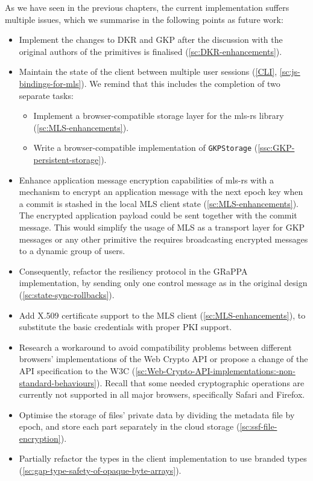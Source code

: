 As we have seen in the previous chapters,
the current implementation suffers multiple issues,
which we summarise in the following points as future work:
\begin{itemize}
    \item Implement the changes to DKR and GKP after the discussion with the original authors of the primitives is finalised (\cref{sc:DKR-enhancements}).
    \item Maintain the state of the client between multiple user sessions (\cref{CLI}, \cref{sc:js-bindings-for-mls}). We remind that this includes the completion of two separate tasks:
    \begin{itemize}
        \item Implement a browser-compatible storage layer for the mls-rs library (\cref{sc:MLS-enhancements}).
        \item Write a browser-compatible implementation of \texttt{GKPStorage} (\cref{ssc:GKP-persistent-storage}).
    \end{itemize}
    \item Enhance application message encryption capabilities of mls-rs with a mechanism to encrypt an application message with the next epoch key when a commit is stashed in the local MLS client state (\cref{sc:MLS-enhancements}). The encrypted application payload could be sent together with the commit message. This would simplify the usage of MLS as a transport layer for GKP messages or any other primitive the requires broadcasting encrypted messages to a dynamic group of users. 
    \item Consequently, refactor the resiliency protocol in the GRaPPA implementation, by sending only one control message as in the original design (\cref{sc:state-sync-rollbacks}).
    \item Add X.509 certificate support to the MLS client (\cref{sc:MLS-enhancements}), to substitute the basic credentials with proper PKI support.
    \item Research a workaround to avoid compatibility problems between different browsers' implementations of the Web Crypto API or propose a change of the API specification to the W3C  (\cref{sc:Web-Crypto-API-implementations:-non-standard-behaviours}). Recall that some needed cryptographic operations are currently not supported in all major browsers, specifically Safari and Firefox. 
    \item Optimise the storage of files' private data by dividing the metadata file by epoch, and store each part separately in the cloud storage (\cref{sc:ssf-file-encryption}).
    \item Partially refactor the types in the client implementation to use branded types (\cref{sc:gap-type-safety-of-opaque-byte-arrays}).
\end{itemize}

